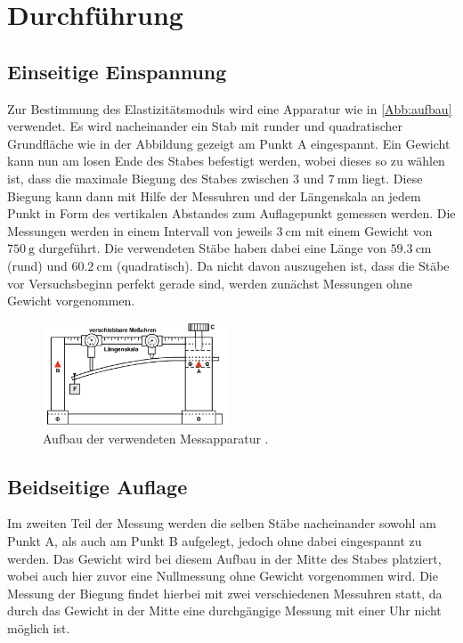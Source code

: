 \section{Durchführung}
\label{sec:Durchführung}

\subsection{Einseitige Einspannung}

Zur Bestimmung des Elastizitätsmoduls wird eine Apparatur wie in \autoref{Abb:aufbau} verwendet. Es wird nacheinander ein Stab mit runder und quadratischer Grundfläche
wie in der Abbildung gezeigt am Punkt A eingespannt. Ein Gewicht kann nun am losen Ende des Stabes befestigt werden, wobei dieses so zu wählen ist, dass die maximale Biegung des Stabes zwischen 
3 und $\SI{7}{\milli\meter}$ liegt. Diese Biegung kann dann mit Hilfe der Messuhren und der Längenskala an jedem Punkt in Form des vertikalen Abstandes zum Auflagepunkt gemessen werden. Die Messungen
werden in einem Intervall von jeweils $\SI{3}{\centi\meter}$ mit einem Gewicht von $\SI{750}{\gram}$ durgeführt. Die verwendeten Stäbe haben dabei eine Länge von $\SI{59,3}{\centi\meter}$
(rund) und $\SI{60,2}{\centi\meter}$ (quadratisch).
Da nicht davon auszugehen ist, dass die Stäbe vor Versuchsbeginn perfekt gerade sind, werden zunächst Messungen ohne Gewicht vorgenommen.
\begin{figure}
    \centering
    \includegraphics[width=5.5cm]{Dateien/v103Abbildung.jpg}
    \caption{Aufbau der verwendeten Messapparatur \cite{v103}.}
    \label{Abb:aufbau}
\end{figure}


\subsection{Beidseitige Auflage}
Im zweiten Teil der Messung werden die selben Stäbe nacheinander sowohl am Punkt A, als auch am Punkt B aufgelegt, jedoch ohne dabei eingespannt zu werden. Das Gewicht wird bei
diesem Aufbau in der Mitte des Stabes platziert, wobei auch hier zuvor eine Nullmessung ohne Gewicht vorgenommen wird. Die Messung der Biegung findet hierbei mit zwei verschiedenen Messuhren
statt, da durch das Gewicht in der Mitte eine durchgängige Messung mit einer Uhr nicht möglich ist.